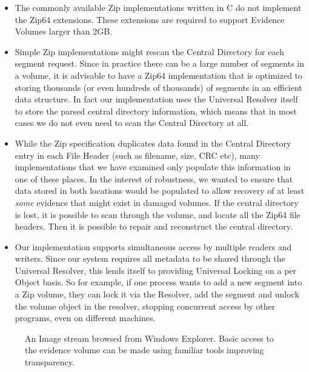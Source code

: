 \documentclass[10pt, conference]{IEEEtran}
\begin{document}
\begin{itemize}
\item The commonly available Zip implementations written in C do not
 implement the Zip64 extensions. These extensions are required to
 support Evidence Volumes larger than 2GB.

\item Simple Zip implementations might rescan the
  Central Directory for each segment request. Since in practice there
  can be a large number of segments in a volume, it is advisable to
  have a Zip64 implementation that is optimized to storing thousands
  (or even hundreds of thousands) of segments in an efficient data
  structure. In fact our implementation uses the Universal Resolver
  itself to store the parsed central directory information, which
  means that in most cases we do not even need to scan the Central
  Directory at all.

\item While the Zip specification duplicates data found in the Central
  Directory entry in each File Header (such as filename, size, CRC
  etc), many implementations that we have examined only populate this
  information in one of these places. In the interest of robustness,
  we wanted to ensure that data stored in both locations would be
  populated to allow recovery of at least \emph{some} evidence that
  might exist in damaged volumes. If the central directory is lost, it
  is possible to scan through the volume, and locate all the Zip64
  file headers. Then it is possible to repair and reconstruct the
  central directory.

\item Our implementation supports simultaneous access by multiple
  readers and writers. Since our system requires all metadata to be
  shared through the Universal Resolver, this lends itself to
  providing Universal Locking on a per Object basis. So for example,
  if one process wants to add a new segment into a Zip volume, they
  can lock it via the Resolver, add the segment and unlock the volume
  object in the resolver, stopping concurrent access by other
  programs, even on different machines.
\end{itemize}

\begin{figure}[tbp]
  \begin{center}
  \mbox{\columnwidth {}}

  \caption{An Image stream browsed from Windows Explorer.  Basic
  access to the evidence volume can be made using familiar tools
  improving transparency.}

  \label{explorer}
  \end{center}
\end{figure}
\end{document}
